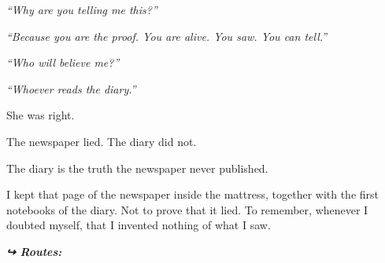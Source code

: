 \noindent \textit{\textquotedblleft{}Why are you telling me this?\textquotedblright{}}

\noindent \textit{\textquotedblleft{}Because you are the proof. You are alive. You saw. You can tell.\textquotedblright{}}

\noindent \textit{\textquotedblleft{}Who will believe me?\textquotedblright{}}

\noindent \textit{\textquotedblleft{}Whoever reads the diary.\textquotedblright{}}

\noindent She was right.

\noindent The newspaper lied.
The diary did not.

\noindent The diary is the truth the newspaper never published.

\noindent I kept that page of the newspaper inside the mattress, together with the first notebooks of the diary. Not to prove that it lied. To remember, whenever I doubted myself, that I invented nothing of what I saw.

\vspace{0.5em}
\noindent\textit{\textbf{↪ Routes:}  \rotasep {}}
